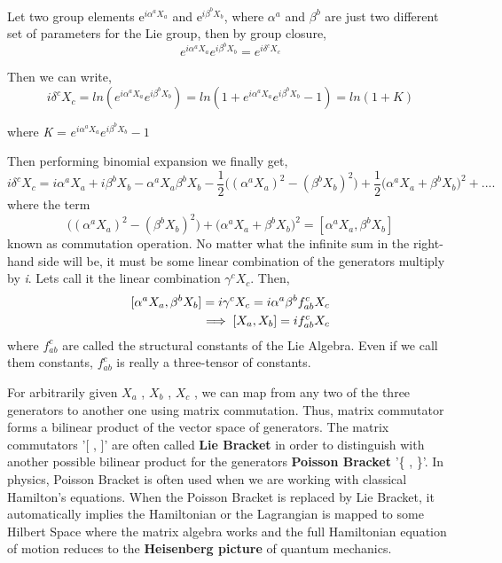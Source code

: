 Let two group elements e$^{i\alpha^aX_a}$ and e$^{i\beta^bX_b}$, where $\alpha^a$ and $\beta^b$ are just two different set of
parameters for the Lie group, then by group closure,
\begin{equation}
    e^{i\alpha^aX_a} e^{i\beta^bX_b} = e^{i\delta^cX_c}
\end{equation}

Then we can write, 
\begin{equation}
    i\delta^cX_c = ln(e^{i\alpha^aX_a} e^{i\beta^bX_b}) = ln(1+ e^{i\alpha^aX_a} e^{i\beta^bX_b} -1) = ln(1+K)
\end{equation}

where \textit{K} = $e^{i\alpha^aX_a} e^{i\beta^bX_b} -1$

Then performing binomial expansion we finally get,
\begin{equation}
    i\delta^cX_c = i\alpha^aX_a + i\beta^bX_b - \alpha^aX_a \beta^bX_b - \frac{1}{2}\Big((\alpha^aX_a)^2-(\beta^bX_b)^2\Big) + \frac{1}{2}\Big(\alpha^aX_a + \beta^bX_b\Big)^2 + ....
\end{equation}
where the term 
\begin{equation}
    \Big((\alpha^aX_a)^2-(\beta^bX_b)^2\Big) + \Big(\alpha^aX_a + \beta^bX_b\Big)^2 = [\alpha^aX_a, \beta^bX_b]
\end{equation}
known as commutation operation.
No matter what the infinite sum in the right-hand side will be, it must be some linear combination of the generators multiply by \textit{i}.
Lets call it the linear combination $\gamma^c X_c$. Then,
\begin{equation}
    \begin{aligned}
        \relax [\alpha^aX_a, \beta^bX_b] = i\gamma^c X_c = i \alpha^a \beta^b f^c_{ab} X_c\\
       \implies [X_a, X_b] = i f^c_{ab} X_c 
    \end{aligned}
\end{equation}
where $f^c_{ab}$ are called the structural constants of the Lie Algebra. 
Even if we call them constants, $f^c_{ab}$ is really a three-tensor of constants.

For arbitrarily given $X_a$ , $X_b$ , $X_c$ , we can map from any two of the three generators to another one using matrix commutation. 
Thus, matrix commutator forms a bilinear product of the vector space of generators. 
The matrix commutators '[ , ]' are often called \textbf{Lie Bracket} in order to distinguish with another possible bilinear product for the generators \textbf{Poisson Bracket} '\{ , \}'.
In physics, Poisson Bracket is often used when we are working with classical Hamilton's equations. 
When the Poisson Bracket is replaced by Lie Bracket, it automatically implies the Hamiltonian or the Lagrangian is mapped to some Hilbert Space where the matrix
algebra works and the full Hamiltonian equation of motion reduces to the \textbf{Heisenberg picture} of quantum mechanics.

\newpage
